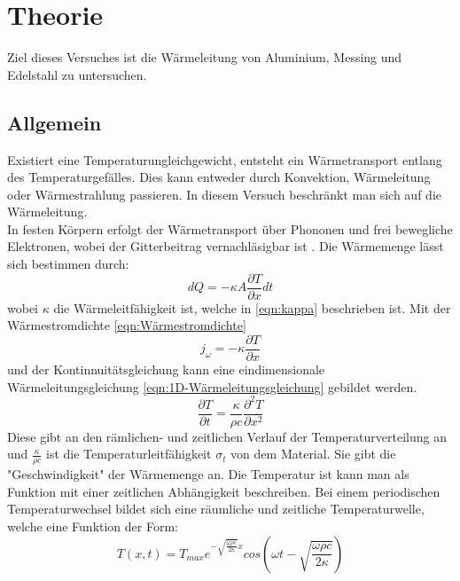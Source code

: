 \section{Theorie}
\label{sec:Theorie}
 
Ziel dieses Versuches ist die Wärmeleitung von Aluminium, Messing und Edelstahl zu untersuchen.

\subsection{Allgemein}

Existiert eine Temperaturungleichgewicht, entsteht ein Wärmetransport entlang des Temperaturgefälles. 
Dies kann entweder durch Konvektion, Wärmeleitung oder Wärmestrahlung passieren.
In diesem Versuch beschränkt man sich auf die Wärmeleitung.\\
In festen Körpern erfolgt der Wärmetransport über Phononen und frei bewegliche Elektronen, wobei der Gitterbeitrag vernachläsigbar ist \cite[1]{V204}.
Die Wärmemenge lässt sich bestimmen durch:
\begin{equation}
    dQ = -\kappa A \frac{\partial T}{\partial x} dt
    \label{eqn:Wärmemenge}
\end{equation}
wobei $\kappa$ die Wärmeleitfähigkeit ist, welche in \autoref{eqn:kappa} beschrieben ist.
Mit der Wärmestromdichte \autoref{eqn:Wärmestromdichte}
\begin{equation}
    j_{\omega} = -\kappa\frac{\partial T}{\partial x}
    \label{eqn:Wärmestromdichte}
\end{equation}
und der Kontinnuitätsgleichung kann eine eindimensionale Wärmeleitungsgleichung \autoref{eqn:1D-Wärmeleitungsgleichung} gebildet werden.
\begin{equation}
    \frac{\partial T}{\partial t} = \frac{\kappa}{\rho c} \frac{\partial ^2 T}{\partial x^2}
    \label{eqn:1D-Wärmeleitungsgleichung}
\end{equation}
Diese gibt an den rämlichen- und zeitlichen Verlauf der Temperaturverteilung an und $\frac{\kappa}{\rho c}$ ist die Temperaturleitfähigkeit $\sigma_t$ von dem Material.
Sie gibt die "Geschwindigkeit" der Wärmemenge an.
Die Temperatur ist kann man als Funktion mit einer zeitlichen Abhängigkeit beschreiben.
Bei einem periodischen Temperaturwechsel bildet sich eine räumliche und zeitliche Temperaturwelle, welche eine Funktion der Form:
\begin{equation}
   T(x,t) = T_{max} e^{-\sqrt{\frac{\omega \rho c}{2 \kappa}}x} cos(\omega t - \sqrt{\frac{\omega \rho c}{2 \kappa}})
\end{equation} 